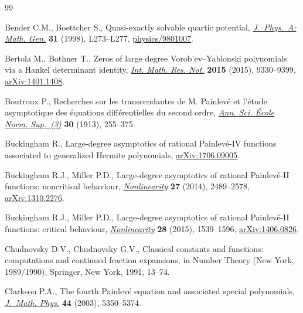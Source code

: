 \documentclass[pdftex]{sigma}
\numberwithin{equation}{section}
\begin{document}
\begin{thebibliography}{99}
\footnotesize\itemsep=0pt

Bender C.M., Boettcher S., Quasi-exactly solvable quartic potential,
 \href{https://doi.org/10.1088/0305-4470/31/14/001}{\textit{J.~Phys.~A: Math. Gen.}} \textbf{31} (1998), L273--L277,
 \href{https://arxiv.org/abs/physics/9801007}{physics/9801007}.

Bertola M., Bothner T., Zeros of large degree {V}orob'ev--{Y}ablonski
 polynomials via a {H}ankel determinant identity, \href{https://doi.org/10.1093/imrn/rnu239}{\textit{Int. Math. Res.
 Not.}} \textbf{2015} (2015), 9330--9399, \href{https://arxiv.org/abs/1401.1408}{arXiv:1401.1408}.

Boutroux P., Recherches sur les transcendantes de {M}. {P}ainlev\'e et
 l'\'etude asymptotique des \'equations dif\/f\'erentielles du second ordre,
 \href{https://doi.org/10.24033/asens.661}{\textit{Ann. Sci. \'Ecole Norm. Sup.~(3)}} \textbf{30} (1913), 255--375.

Buckingham R., Large-degree asymptotics of rational {P}ainlev\'e-{IV} functions
 associated to generalized {H}ermite polynomials, \href{https://arxiv.org/abs/1706.09005}{arXiv:1706.09005}.

Buckingham R.J., Miller P.D., Large-degree asymptotics of rational
 {P}ainlev\'e-{II} functions: noncritical behaviour, \href{https://doi.org/10.1088/0951-7715/27/10/2489}{\textit{Nonlinearity}}
 \textbf{27} (2014), 2489--2578, \href{https://arxiv.org/abs/1310.2276}{arXiv:1310.2276}.

Buckingham R.J., Miller P.D., Large-degree asymptotics of rational
 {P}ainlev\'e-{II} functions: critical behaviour, \href{https://doi.org/10.1088/0951-7715/28/6/1539}{\textit{Nonlinearity}}
 \textbf{28} (2015), 1539--1596, \href{https://arxiv.org/abs/1406.0826}{arXiv:1406.0826}.

Chudnovsky D.V., Chudnovsky G.V., Classical constants and functions:
 computations and continued fraction expansions, in Number Theory ({N}ew
 {Y}ork, 1989/1990), Springer, New York, 1991, 13--74.

Clarkson P.A., The fourth {P}ainlev\'e equation and associated special
 polynomials, \href{https://doi.org/10.1063/1.1603958}{\textit{J.~Math. Phys.}} \textbf{44} (2003), 5350--5374.


\end{thebibliography}
\end{document}
